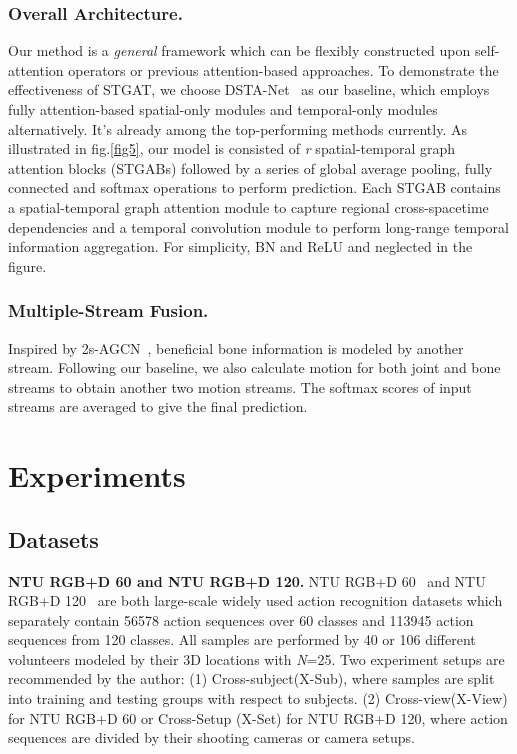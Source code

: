 \documentclass[runningheads]{llncs}
\begin{document}
\subsubsection{Overall Architecture.}
Our method is a \textit{general} framework which can be flexibly constructed upon self-attention operators or previous attention-based approaches. To demonstrate the effectiveness of STGAT, we choose DSTA-Net~\cite{shi2020decoupled} as our baseline, which employs fully attention-based spatial-only modules and temporal-only modules alternatively. It's already among the top-performing methods currently. As illustrated in fig.\ref{fig5}, our model is consisted of \textit{r} spatial-temporal graph attention blocks (STGABs) followed by a series of global average pooling, fully connected and softmax operations to perform prediction. Each STGAB contains a spatial-temporal graph attention module to capture regional cross-spacetime dependencies and a temporal convolution module to perform long-range temporal information aggregation. For simplicity, BN and ReLU and neglected in the figure.
\subsubsection{Multiple-Stream Fusion.}
Inspired by 2s-AGCN~\cite{shi2019two}, beneficial bone information is modeled by another stream. Following our baseline, we also calculate motion for both joint and bone streams to obtain another two motion streams. The softmax scores of input streams are averaged to give the final prediction.
  
\section{Experiments}
\subsection{Datasets}
\textbf{NTU RGB+D 60 and NTU RGB+D 120.} NTU RGB+D 60~\cite{shahroudy2016ntu} and NTU RGB+D 120~\cite{liu2019ntu} are both large-scale widely used action recognition datasets which separately contain 56578 action sequences over 60 classes and 113945 action sequences from 120 classes. All samples are performed by 40 or 106 different volunteers modeled by their 3D locations with \textit{N}=25. Two experiment setups are recommended by the author: (1) Cross-subject(X-Sub), where samples are split into training and testing groups with respect to subjects. (2) Cross-view(X-View) for NTU RGB+D 60 or Cross-Setup (X-Set) for NTU RGB+D 120, where action sequences are divided by their shooting cameras or camera setups.
  
\end{document}
